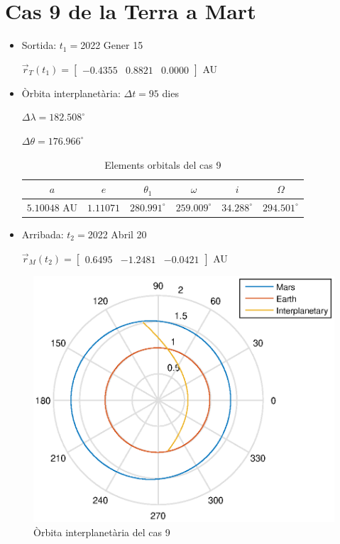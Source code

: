 \section{Cas 9 de la Terra a Mart}
\begin{itemize}
	\item Sortida: $t_{1}=$2022 Gener 15

$\vec{r}_{T}(t_{1})=\begin{bmatrix}-0.4355 & 0.8821 & 0.0000\end{bmatrix}$ AU

	\item Òrbita interplanetària: $\Delta t=95$ dies

$\Delta\lambda=182.508^{\circ}$

$\Delta\theta=176.966^{\circ}$
\begin{table}[h!]
	\centering
	\begin{tabular}{ |c|c|c|c|c|c|}
		\hline
		$a$ & $e$ & $\theta_{1}$ & $\omega$ & $i$ & $\Omega$ \\ \hline
		$5.10048$ AU  & $1.11071$ & $280.991^{\circ}$ & $259.009^{\circ}$ & $34.288^{\circ}$ & $294.501^{\circ}$ \\ \hline
	\end{tabular}
	\caption{Elements orbitals del cas 9}
\end{table}

	\item Arribada: $t_{2}=$2022 Abril 20

$\vec{r}_{M}(t_{2})=\begin{bmatrix}0.6495 & -1.2481 & -0.0421\end{bmatrix}$ AU
\end{itemize}
\begin{figure}[H]
	\centering
	\includegraphics[scale=0.95]{./plots/cas9}
	\caption{Òrbita interplanetària del cas 9}
\end{figure}